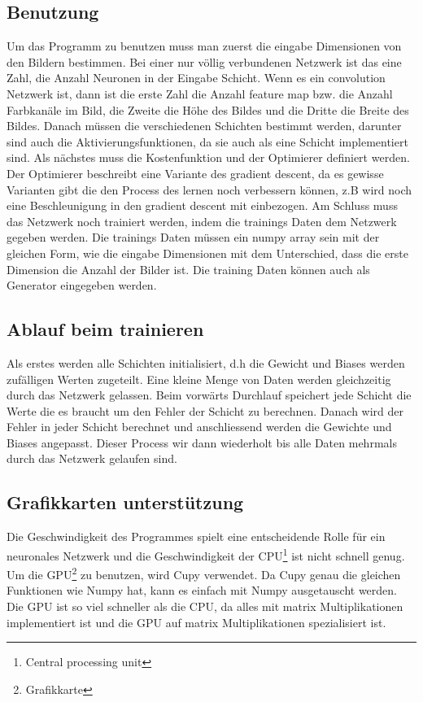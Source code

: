 \documentclass[12pt,a4paper]{report}
\begin{document}
\subsection{Benutzung}
Um das Programm zu benutzen muss man zuerst die eingabe Dimensionen von den Bildern bestimmen.
Bei einer nur völlig verbundenen Netzwerk ist das eine Zahl, die Anzahl Neuronen in der Eingabe Schicht.
Wenn es ein convolution Netzwerk ist, dann ist die erste Zahl die Anzahl feature map bzw. die Anzahl Farbkanäle im Bild,
die Zweite die Höhe des Bildes und die Dritte die Breite des Bildes.
Danach müssen die verschiedenen Schichten bestimmt werden, darunter sind auch die Aktivierungsfunktionen, da sie auch als eine Schicht implementiert sind.
Als nächstes muss die Kostenfunktion und der Optimierer definiert werden.
Der Optimierer beschreibt eine Variante des gradient descent,
da es gewisse Varianten gibt die den Process des lernen noch verbessern können,
z.B wird noch eine Beschleunigung in den gradient descent mit einbezogen.\cite{optimization}
Am Schluss muss das Netzwerk noch trainiert werden, indem die trainings Daten dem Netzwerk gegeben werden.
Die trainings Daten müssen ein numpy array sein mit der gleichen Form, wie die eingabe Dimensionen mit dem Unterschied,
dass die erste Dimension die Anzahl der Bilder ist.
Die training Daten können auch als Generator eingegeben werden.

\subsection{Ablauf beim trainieren}
Als erstes werden alle Schichten initialisiert, d.h die Gewicht und Biases werden zufälligen Werten zugeteilt.
Eine kleine Menge von Daten werden gleichzeitig durch das Netzwerk gelassen.
Beim vorwärts Durchlauf speichert jede Schicht die Werte die es braucht um den Fehler der Schicht zu berechnen.
Danach wird der Fehler in jeder Schicht berechnet und anschliessend werden die Gewichte und Biases angepasst.
Dieser Process wir dann wiederholt bis alle Daten mehrmals durch das Netzwerk gelaufen sind.


\subsection{Grafikkarten unterstützung}
Die Geschwindigkeit des Programmes spielt eine entscheidende Rolle für ein neuronales Netzwerk und die Geschwindigkeit der CPU\footnote{Central processing unit} ist nicht schnell genug.
Um die GPU\footnote{Grafikkarte} zu benutzen, wird Cupy verwendet.
Da Cupy genau die gleichen Funktionen wie Numpy hat, kann es einfach mit Numpy ausgetauscht werden.
Die GPU ist so viel schneller als die CPU, da alles mit matrix Multiplikationen implementiert ist und die GPU auf matrix Multiplikationen spezialisiert ist.
\end{document}
